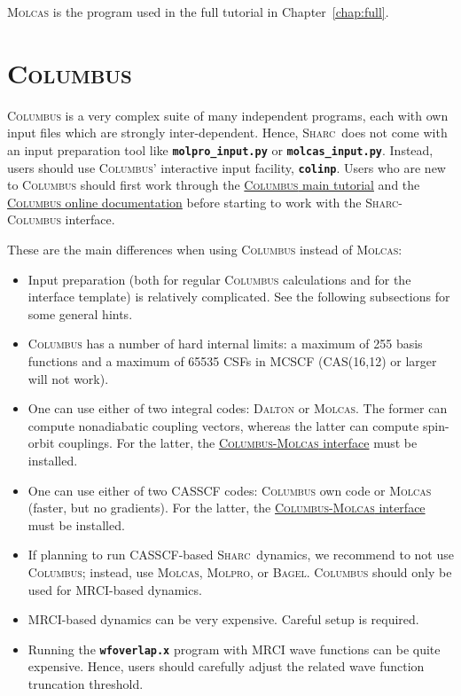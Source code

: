 \documentclass[a4paper,11pt,DIV=15,openany]{scrbook}
\makeatletter
\newcommand{\link}[2]{\href{#1}{#2}}
\newcommand{\refermanual}[2][rectangle,draw=B,thick,fill=black!5,inner sep=1pt,outer sep=0pt,rounded corners]{\marginpar{\tikz[baseline=(current bounding box.north)]\node at (0,0) [#1]{\begin{tabular}{@{}l@{}}See\\ section\\ \ref*{#2}\\ (p. \pageref*{#2})\\ in the\\ manual.\end{tabular}};}}
\newcommand{\sharc}{\textsc{Sharc}}
\newcommand{\ttt}[1]{\textbf{\texttt{#1}}}
\makeatother
\begin{document}
\textsc{Molcas} is the program used in the full tutorial in Chapter~\ref{chap:full}.


\section{\textsc{Columbus}}
\refermanual{m-sec:int:columbus}

\textsc{Columbus} is a very complex suite of many independent programs, each with own input files which are strongly inter-dependent.
Hence, \sharc\ does not come with an input preparation tool like \ttt{molpro\_input.py} or \ttt{molcas\_input.py}.
Instead, users should use \textsc{Columbus}' interactive input facility, \ttt{colinp}.
Users who are new to \textsc{Columbus} should first work through the \link{http://www.univie.ac.at/columbus/docs_COL70/tutorial.pdf}{\textsc{Columbus} main tutorial} and the \link{http://www.univie.ac.at/columbus/docs_COL70/documentation_main.html}{\textsc{Columbus} online documentation} before starting to work with the \sharc-\textsc{Columbus} interface.

These are the main differences when using \textsc{Columbus} instead of \textsc{Molcas}:
\begin{itemize}
  \item Input preparation (both for regular \textsc{Columbus} calculations and for the interface template) is relatively complicated. See the following subsections for some general hints.
  \item \textsc{Columbus} has a number of hard internal limits: a maximum of 255 basis functions and a maximum of 65535 CSFs in MCSCF (CAS(16,12) or larger will not work).
  \item One can use either of two integral codes: \textsc{Dalton} or \textsc{Molcas}. The former can compute nonadiabatic coupling vectors, whereas the latter can compute spin-orbit couplings. For the latter, the \link{http://www.univie.ac.at/columbus/docs_COL70/columbus_molcas_link.html}{\textsc{Columbus-Molcas} interface} must be installed.
  \item One can use either of two CASSCF codes: \textsc{Columbus} own code or \textsc{Molcas} (faster, but no gradients). For the latter, the \link{http://www.univie.ac.at/columbus/docs_COL70/columbus_molcas_link.html}{\textsc{Columbus-Molcas} interface} must be installed.
  \item If planning to run CASSCF-based \sharc\ dynamics, we recommend to not use \textsc{Columbus}; instead, use \textsc{Molcas}, \textsc{Molpro}, or \textsc{Bagel}. \textsc{Columbus} should only be used for MRCI-based dynamics.
  \item MRCI-based dynamics can be very expensive. Careful setup is required.
  \item Running the \ttt{wfoverlap.x} program with MRCI wave functions can be quite expensive. Hence, users should carefully adjust the related wave function truncation threshold.
\end{itemize}
\end{document}
